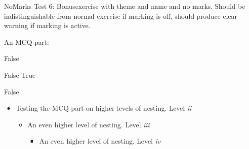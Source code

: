 \documentclass[pdftex,quiz,formula]{newcsen}
\begin{document}
\begin{bonusexercise}{}{No}{Marks}
  Test 6: Bonusexercise with theme and name and no marks. Should be
  indistinguishable from normal exercise if marking is off, should
  produce clear warning if marking is active.

  An MCQ part:
  \begin{mcq}
    \item False
    \item False
      \checkedItem True
    \item False
  \end{mcq}
  \begin{itemize}
  \item Testing the MCQ part on higher levels of nesting. Level \emph{ii}
    \begin{itemize}
    \item An even higher level of nesting. Level \emph{iii}
      \begin{itemize}
      \item An even higher level of nesting. Level \emph{iv}
      \end{itemize}
    \end{itemize}
  \end{itemize}
\end{bonusexercise}
\end{document}
